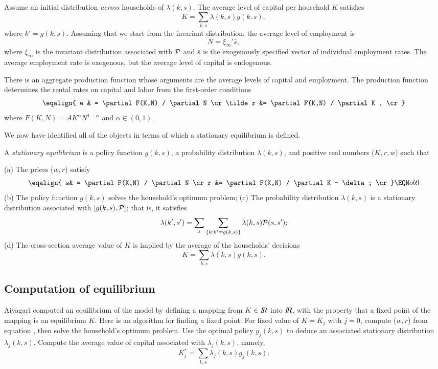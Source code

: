   Assume an initial distribution {\it across\/} households
of $\lambda(k,s)$.
 The average level of capital per
household $K$ satisfies
$$ K = \sum_{k,s} \lambda(k,s) g(k,s),$$
where $k' = g(k,s)$.
Assuming that we start from the invariant distribution,
the
average level of employment is
$$ N = \xi_\infty' \bar s,$$
where $\xi_\infty$ is the invariant distribution associated
with $\cal P$ and $\bar s$ is the exogenously
specified vector of individual employment rates. The
average employment rate is exogenous, but
the average level of capital is endogenous.

There is an aggregate production function whose
arguments are the average levels of capital and employment.
The production function determines the rental
rates on capital and labor from the first-order conditions
$$\eqalign{ w  & = \partial F(K,N) / \partial N \cr
      \tilde r   &= \partial F(K,N) / \partial K , \cr} $$
where $F(K,N)= A K^\alpha N^{1-\alpha}$ and
$\alpha \in (0,1)$.

We now have identified
all of the objects in terms of which a stationary equilibrium
is defined.

\medskip{} A {\it stationary equilibrium\/}
is a policy function $g(k,s)$, a probability distribution
$\lambda (k,s)$, and positive real numbers ($K, r,w$) such that
\medskip


\noindent(a) The prices ($w,r$) satisfy
$$\eqalign{ w& = \partial F(K,N) / \partial N \cr
       r &= \partial F(K,N) / \partial K - \delta ; \cr} \EQN ob9 $$
\medskip
\noindent(b) The policy function $g(k,s)$ solves the household's
optimum problem;
\medskip
\noindent(c) The probability distribution $\lambda(k,s)$ is a
stationary distribution associated with $[g(k,s), {\cal P}]$;
that is, it satisfies
$$ \lambda(k',s') = \sum_s \sum_{\{ k: k'=g(k,s) \}} \lambda(k,s)
 {\cal P}(s,s');$$
\medskip
\noindent(d) The cross-section average value of $K$ is implied by the average
of the  households'
decisions $$ K = \sum_{k,s} \lambda(k,s) g(k,s)  .$$



\subsection{Computation of equilibrium}
 Aiyagari computed an equilibrium of the model
by defining a mapping from $K \in {{I\kern-0.3em R}}$
into ${I\kern-0.3em R}$, with the property that a fixed point of the mapping is
an equilibrium $K$. Here is
an algorithm for finding a fixed point:
\medskip
{} For fixed value of $K=K_j$ with $j=0$, compute ($w,r$) from
equation
, then solve the household's optimum problem. Use the optimal
policy $g_j(k,s)$ to deduce an associated stationary distribution
$\lambda_j(k,s)$.
\medskip
{} Compute the average value of capital associated
with $\lambda_j(k,s)$, namely,
$$ K_j^* = \sum_{k,s} \lambda_j(k,s) g_j(k,s)  .$$

